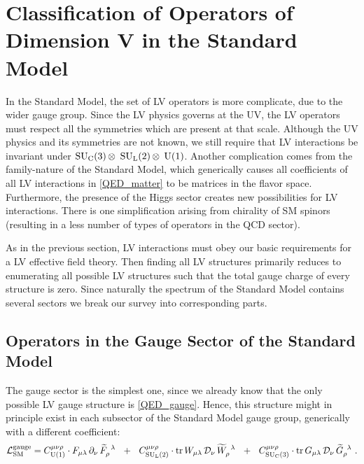 \documentclass[12pt]{revtex4}
\newcommand{\wt}{\widetilde}
\newcommand{\suc}{{{\rm SU}_{\rm C}(3)}}
\newcommand{\sul}{{{\rm SU}_{\rm L}(2)}}
\newcommand{\ue}{{{\rm U}(1)}}
\begin{document}
\section{Classification of Operators of Dimension V in the Standard Model}

	In the Standard Model, the set of LV operators is more complicate,
	due to the wider gauge group. 
	Since the LV physics governs at the UV, the LV operators must 
	respect all the symmetries which are present at that scale.
	Although the UV physics and its symmetries are not known, we
	still require that LV interactions be invariant under 
	$ \suc\, \otimes $ $ \sul\, \otimes $ $ \ue $.
	Another complication comes from the family-nature of the
	Standard Model, which generically causes all coefficients
	of all LV interactions in \eqref{QED_matter} to be 
	matrices in the flavor space.
	Furthermore, the presence of the Higgs sector creates new
	possibilities for LV interactions. 
	There is one simplification arising from chirality of
	SM spinors (resulting in a less number of types of operators in the 
	QCD sector).

	As in the previous section, LV interactions must obey 
	our basic requirements for a LV effective field theory.
	Then finding all LV structures primarily reduces to enumerating all 
	possible LV structures
	such that the total gauge charge of every structure is zero.
	Since naturally the spectrum of the Standard Model contains
	several sectors we break our survey into corresponding parts.
	
\subsection{Operators in the Gauge Sector of the Standard Model}

	The gauge sector is the simplest one, since we already know
	that the only possible LV gauge structure is 
	\eqref{QED_gauge}.
	Hence, this structure might in principle exist in each subsector
	of the Standard Model gauge group, generically with a different
	coefficient:
\begin{equation}
\label{SM_gauge}
	\mathcal{L}_{\rm SM}^{\rm gauge} = 
	C_{\ue}^{\mu\nu\rho} \cdot 
	F_{\mu\lambda} \,\partial_\nu\, \wt{F}_\rho^{\phantom{\rho}\lambda}
	~~+~~
	C_{\sul}^{\mu\nu\rho} \cdot 
	{\rm tr}\,
	W_{\mu\lambda} \,\mathcal{D}_\nu\, \wt{W}_\rho^{\phantom{\rho}\lambda}
	~~+~~
	C_{\suc}^{\mu\nu\rho} \cdot 
	{\rm tr}\,
	G_{\mu\lambda} \,\mathcal{D}_\nu\, \wt{G}_\rho^{\phantom{\rho}\lambda}
	~.
\end{equation}
\end{document}
